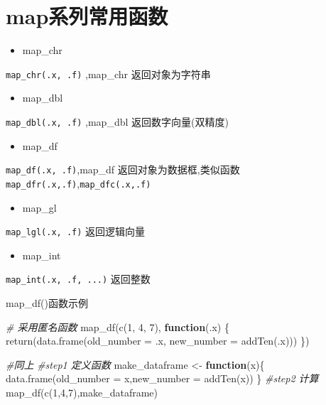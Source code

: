 \documentclass[
]{book}
\newenvironment{Shaded}{\begin{snugshade}}{\end{snugshade}}
\newcommand{\AttributeTok}[1]{\textcolor[rgb]{0.77,0.63,0.00}{#1}}
\newcommand{\CommentTok}[1]{\textcolor[rgb]{0.56,0.35,0.01}{\textit{#1}}}
\newcommand{\ControlFlowTok}[1]{\textcolor[rgb]{0.13,0.29,0.53}{\textbf{#1}}}
\newcommand{\DecValTok}[1]{\textcolor[rgb]{0.00,0.00,0.81}{#1}}
\newcommand{\FunctionTok}[1]{\textcolor[rgb]{0.00,0.00,0.00}{#1}}
\newcommand{\NormalTok}[1]{#1}
\newcommand{\OtherTok}[1]{\textcolor[rgb]{0.56,0.35,0.01}{#1}}
\providecommand{\tightlist}{%
  \setlength{\itemsep}{0pt}\setlength{\parskip}{0pt}}
\begin{document}
\hypertarget{mapux7cfbux5217ux5e38ux7528ux51fdux6570}{%
\section{map系列常用函数}\label{mapux7cfbux5217ux5e38ux7528ux51fdux6570}}

\begin{itemize}
\tightlist
\item
  map\_chr
\end{itemize}

\texttt{map\_chr(.x,\ .f)} ,map\_chr 返回对象为字符串

\begin{itemize}
\tightlist
\item
  map\_dbl
\end{itemize}

\texttt{map\_dbl(.x,\ .f)} ,map\_dbl 返回数字向量(双精度)

\begin{itemize}
\tightlist
\item
  map\_df
\end{itemize}

\texttt{map\_df(.x,\ .f)},map\_df 返回对象为数据框,类似函数 \texttt{map\_dfr(.x,.f)},\texttt{map\_dfc(.x,.f)}

\begin{itemize}
\tightlist
\item
  map\_gl
\end{itemize}

\texttt{map\_lgl(.x,\ .f)} 返回逻辑向量

\begin{itemize}
\tightlist
\item
  map\_int
\end{itemize}

\texttt{map\_int(.x,\ .f,\ ...)} 返回整数

map\_df()函数示例

\begin{Shaded}
\begin{Highlighting}[]
\CommentTok{\# 采用匿名函数}
\FunctionTok{map\_df}\NormalTok{(}\FunctionTok{c}\NormalTok{(}\DecValTok{1}\NormalTok{, }\DecValTok{4}\NormalTok{, }\DecValTok{7}\NormalTok{), }\ControlFlowTok{function}\NormalTok{(.x) \{}
  \FunctionTok{return}\NormalTok{(}\FunctionTok{data.frame}\NormalTok{(}\AttributeTok{old\_number =}\NormalTok{ .x, }
                    \AttributeTok{new\_number =} \FunctionTok{addTen}\NormalTok{(.x)))}
\NormalTok{\})}

\CommentTok{\#同上}
\CommentTok{\#step1 定义函数}
\NormalTok{make\_dataframe }\OtherTok{\textless{}{-}} \ControlFlowTok{function}\NormalTok{(x)\{}
  \FunctionTok{data.frame}\NormalTok{(}\AttributeTok{old\_number =}\NormalTok{ x,}\AttributeTok{new\_number =} \FunctionTok{addTen}\NormalTok{(x))}
\NormalTok{\}}
\CommentTok{\#step2 计算}
\FunctionTok{map\_df}\NormalTok{(}\FunctionTok{c}\NormalTok{(}\DecValTok{1}\NormalTok{,}\DecValTok{4}\NormalTok{,}\DecValTok{7}\NormalTok{),make\_dataframe)}
\end{Highlighting}
\end{Shaded}
\end{document}

